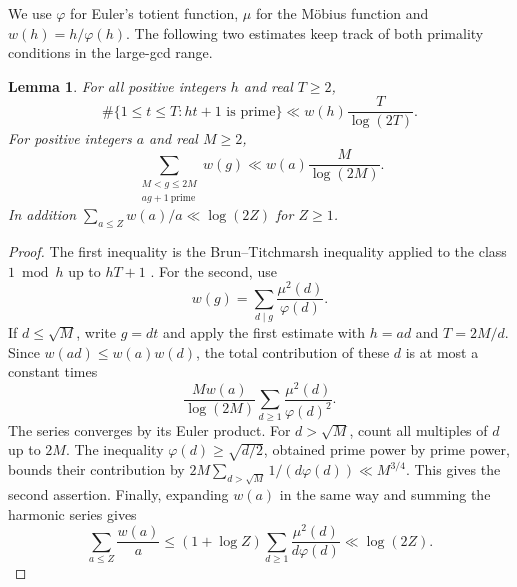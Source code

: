 \documentclass[11pt]{article}
\newtheorem{lemma}[theorem]{Lemma}
\begin{document}
We use \(\varphi\) for Euler's totient function, \(\mu\) for the
M\"obius function and \(w(h)=h/\varphi(h)\).
The following two estimates keep track of both primality conditions
in the large-gcd range.

\begin{lemma}\label{lem:BT}
For all positive integers \(h\) and real \(T\ge2\),
\[
 \#\{1\le t\le T: ht+1\text{ is prime}\}
       \ll w(h)\frac{T}{\log(2T)}.
\]
For positive integers \(a\) and real \(M\ge2\),
\[
 \sum_{\substack{M<g\le2M\\ ag+1\ \mathrm{prime}}}w(g)
        \ll w(a)\frac{M}{\log(2M)}.
\]
In addition \(\sum_{a\le Z} w(a)/a\ll\log(2Z)\) for \(Z\ge1\).
\end{lemma}

\begin{proof}
The first inequality is the Brun--Titchmarsh inequality applied
to the class \(1\bmod h\) up to \(hT+1\) \cite{MV}.
For the second, use
\[
            w(g)=\sum_{d\mid g}\frac{\mu^2(d)}{\varphi(d)}.
\]
If \(d\le\sqrt M\), write \(g=dt\) and apply the first estimate
with \(h=ad\) and \(T=2M/d\). Since \(w(ad)\le w(a)w(d)\),
the total contribution of these \(d\) is at most a constant times
\[
 \frac{M w(a)}{\log(2M)}
      \sum_{d\ge1}\frac{\mu^2(d)}{\varphi(d)^2}.
\]
The series converges by its Euler product. For \(d>\sqrt M\),
count all multiples of \(d\) up to \(2M\). The inequality
\(\varphi(d)\ge\sqrt{d/2}\), obtained prime power by prime power,
bounds their contribution by
\(2M\sum_{d>\sqrt M}1/(d\varphi(d))\ll M^{3/4}\).
This gives the second assertion. Finally, expanding \(w(a)\) in the
same way and summing the harmonic series gives
\[
  \sum_{a\le Z}\frac{w(a)}{a}
       \le (1+\log Z)\sum_{d\ge1}\frac{\mu^2(d)}{d\varphi(d)}
       \ll\log(2Z).
\]
\end{proof}
\end{document}
